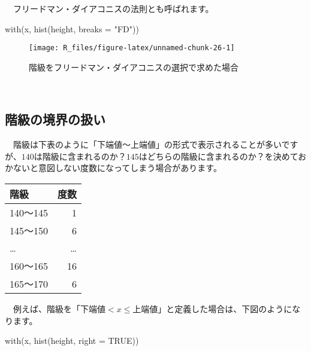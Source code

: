 \documentclass[
  12pt,
]{book}
\newenvironment{Shaded}{\begin{snugshade}}{\end{snugshade}}
\newcommand{\AttributeTok}[1]{\textcolor[rgb]{0.77,0.63,0.00}{#1}}
\newcommand{\ConstantTok}[1]{\textcolor[rgb]{0.00,0.00,0.00}{#1}}
\newcommand{\FunctionTok}[1]{\textcolor[rgb]{0.00,0.00,0.00}{#1}}
\newcommand{\NormalTok}[1]{#1}
\newcommand{\StringTok}[1]{\textcolor[rgb]{0.31,0.60,0.02}{#1}}
\begin{document}
　フリードマン・ダイアコニスの法則とも呼ばれます。

\begin{Shaded}
\begin{Highlighting}[]
\FunctionTok{with}\NormalTok{(x, }\FunctionTok{hist}\NormalTok{(height, }\AttributeTok{breaks =} \StringTok{"FD"}\NormalTok{))}
\end{Highlighting}
\end{Shaded}

\begin{figure}[H]

{\centering \texttt{[image: R\_files/figure-latex/unnamed-chunk-26-1]} 

}

\caption{階級をフリードマン・ダイアコニスの選択で求めた場合}\label{fig:unnamed-chunk-26}
\end{figure}

　

\hypertarget{ux968eux7d1aux306eux5883ux754cux306eux6271ux3044}{%
\subsection*{階級の境界の扱い}\label{ux968eux7d1aux306eux5883ux754cux306eux6271ux3044}}

　階級は下表のように「下端値〜上端値」の形式で表示されることが多いですが、\(140\)は階級に含まれるのか？\(145\)はどちらの階級に含まれるのか？を決めておかないと意図しない度数になってしまう場合があります。

\begin{longtable}[]{@{}lr@{}}
\toprule
階級 & 度数 \\
\midrule
\endhead
140〜145 & 1 \\
145〜150 & 6 \\
\ldots{} & \ldots{} \\
160〜165 & 16 \\
165〜170 & 6 \\
\bottomrule
\end{longtable}

　例えば、階級を「\(\mbox{下端値} < x \leq \mbox{上端値}\)」と定義した場合は、下図のようになります。

\begin{Shaded}
\begin{Highlighting}[]
\FunctionTok{with}\NormalTok{(x, }\FunctionTok{hist}\NormalTok{(height, }\AttributeTok{right =} \ConstantTok{TRUE}\NormalTok{))}
\end{Highlighting}
\end{Shaded}
\end{document}

